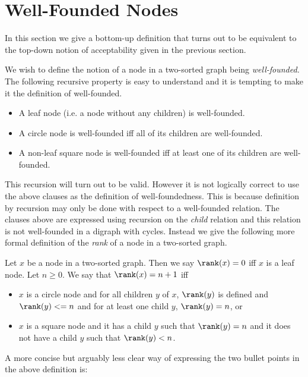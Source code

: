 \documentclass[oneside,12pt]{amsart}
\begin{document}
\section{Well-Founded Nodes}

In this section we give a bottom-up definition that turns out to be equivalent to the top-down
notion of acceptability given in the previous section.

We wish to define the notion of a node in a two-sorted graph being \emph{well-founded.} The following recursive property
is easy to understand and it is tempting to make it the definition of well-founded.

\begin{itemize}
\item A leaf node (i.e. a node without any children) is well-founded.
\item A circle node is well-founded iff all of its children are well-founded.
\item A non-leaf square node is well-founded iff at least one of its children are well-founded.
\end{itemize}

This recursion will turn out to be valid. However it is not logically correct to use the above clauses as the
definition of well-foundedness. This is because definition by recursion may only be done with respect to
a well-founded relation. The clauses above are expressed using recursion on the \emph{child} relation and this
relation is not well-founded in a digraph with cycles. Instead we give the following more formal definition
of the \emph{rank} of a node in a two-sorted graph.

\begin{definition}
Let $x$ be a node in a two-sorted graph. Then we say $\rank(x) = 0$ iff $x$ is a leaf node.
Let $n\geq 0$. We say that $\rank(x) = n+1$ iff
\begin{itemize}
\item $x$ is a circle node and for all children $y$ of $x$, $\rank(y)$ is defined and $\rank(y) <= n$ and for at least one child
$y$, $\rank(y)=n$, or
\item $x$ is a square node and it has a child $y$ such that $\rank(y) = n$ and it does not have a child
$y$ such that $\rank(y) < n$.
\end{itemize}
\end{definition}

A more concise but arguably less clear way of expressing the two bullet points in the above definition is:
\end{document}
